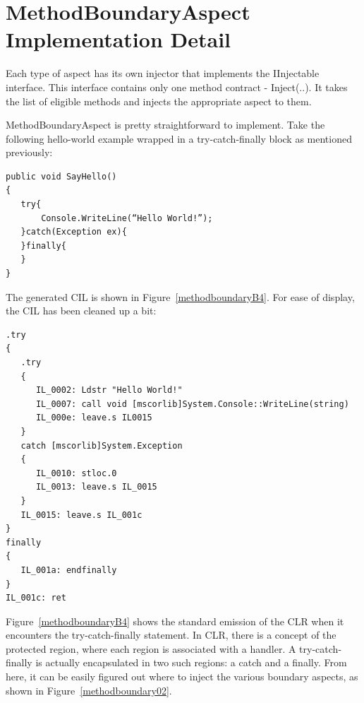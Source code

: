\section{MethodBoundaryAspect Implementation Detail}

Each type of aspect has its own injector that implements the IInjectable interface. This interface contains only one method contract - Inject(..). It takes the list of eligible methods and injects the appropriate aspect to them.

MethodBoundaryAspect is pretty straightforward to implement. Take the following hello-world example wrapped in a try-catch-finally block as mentioned previously:

\begin{lstlisting}[caption={SayHello Function}, label=sayhello]
public void SayHello()
{
   try{
       Console.WriteLine(“Hello World!”);
   }catch(Exception ex){
   }finally{
   }
}
\end{lstlisting}

The generated CIL is shown in Figure~\ref{methodboundaryB4}. For ease of display, the CIL has been cleaned up a bit:

\begin{lstlisting}[caption={CIL Generated for Sample C\# Function}, label=methodboundaryB4]
.try
{
   .try
   {
      IL_0002: Ldstr "Hello World!"
      IL_0007: call void [mscorlib]System.Console::WriteLine(string)
      IL_000e: leave.s IL0015
   }
   catch [mscorlib]System.Exception
   {
      IL_0010: stloc.0
      IL_0013: leave.s IL_0015
   }
   IL_0015: leave.s IL_001c
}
finally
{
   IL_001a: endfinally
}
IL_001c: ret
\end{lstlisting}

Figure~\ref{methodboundaryB4} shows the standard emission of the CLR when it encounters the try-catch-finally statement. In CLR, there is a concept of the protected region, where each region is associated with a handler. A try-catch-finally is actually encapsulated in two such regions: a catch and a finally. From here, it can be easily figured out where to inject the various boundary aspects, as shown in Figure~\ref{methodboundary02}.

